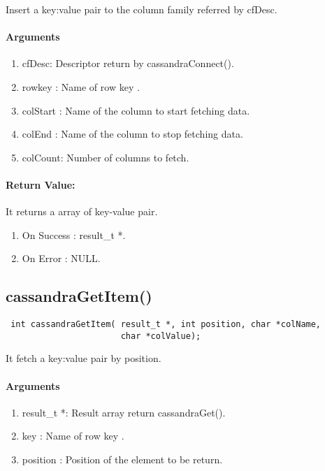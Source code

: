 \documentclass[12 pt , a4paper ]{report}
\begin{document}
  Insert  a key:value pair to the column family referred by cfDesc.

  \paragraph{Arguments}
  \begin{enumerate}
   \item cfDesc: Descriptor return by cassandraConnect().
   \item rowkey : Name of row key .
   \item colStart :  Name of the column to start fetching data.
   \item colEnd : Name of the column to stop fetching data.
   \item colCount: Number of columns to fetch.
  \end{enumerate}

 \paragraph{Return Value:}
 It returns a array of key-value pair.
\begin{enumerate}
 \item On Success : result\_t *.
 \item On Error   : NULL.
\end{enumerate}

\subsection{cassandraGetItem()}
\begin{verbatim}
 int cassandraGetItem( result_t *, int position, char *colName, 
                       char *colValue);
\end{verbatim}

  It fetch  a key:value pair by position.

  \paragraph{Arguments}
  \begin{enumerate}
   \item result\_t *: Result array return cassandraGet().
   \item key : Name of row key .
   \item position : Position of the element to be return. 
  \end{enumerate}
\end{document}
